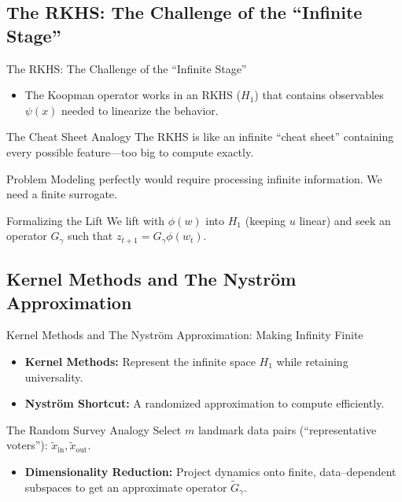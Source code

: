 \documentclass{beamer}
\begin{document}
\subsection{The RKHS: The Challenge of the ``Infinite Stage''}
\begin{frame}[allowframebreaks]{The RKHS: The Challenge of the ``Infinite Stage''}
\begin{itemize}
  \item The Koopman operator works in an RKHS ($H_1$) that contains observables $\psi(x)$ needed to linearize the behavior.
\end{itemize}

\begin{block}{The Cheat Sheet Analogy}
The RKHS is like an infinite ``cheat sheet'' containing every possible feature—too big to compute exactly.
\end{block}

\framebreak

\begin{alertblock}{Problem}
Modeling perfectly would require processing infinite information. We need a finite surrogate.
\end{alertblock}

\begin{block}{Formalizing the Lift}
We lift with $\phi(w)$ into $H_1$ (keeping $u$ linear) and seek an operator $G_\gamma$ such that $z_{t+1}=G_\gamma \phi(w_t)$.
\end{block}
\end{frame}

\subsection{Kernel Methods and The Nyström Approximation}
\begin{frame}[allowframebreaks]{Kernel Methods and The Nyström Approximation: Making Infinity Finite}
\begin{itemize}
  \item \textbf{Kernel Methods:} Represent the infinite space $H_1$ while retaining universality.
  \item \textbf{Nyström Shortcut:} A randomized approximation to compute efficiently.
\end{itemize}

\framebreak

\begin{block}{The Random Survey Analogy}
Select $m$ landmark data pairs (``representative voters''): $\tilde{x}_{\text{in}}, \tilde{x}_{\text{out}}$.
\end{block}

\begin{itemize}
  \item \textbf{Dimensionality Reduction:} Project dynamics onto finite, data–dependent subspaces to get an approximate operator $\widetilde{G}_\gamma$.
\end{itemize}
\end{frame}
\end{document}
